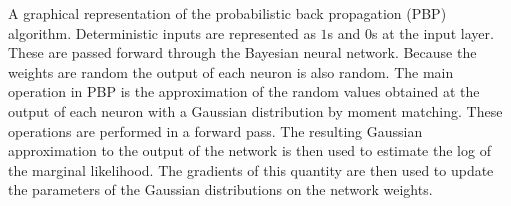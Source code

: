 A graphical representation of the probabilistic back propagation (PBP) algorithm. Deterministic inputs are represented as $1$s and $0$s at the input layer. These are passed forward through the Bayesian neural network. Because the weights are random the output of each neuron is also random. The main operation in PBP is the approximation of the random values obtained at the output of each neuron with a Gaussian distribution by moment matching. These operations are performed in a forward pass. The resulting Gaussian approximation to the output of the network is then used to estimate the log of the marginal likelihood. The gradients of this quantity are then used to update the parameters of the Gaussian distributions on the network weights.